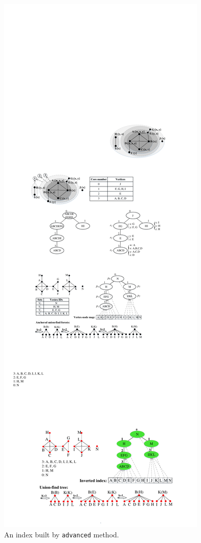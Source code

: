 \begin{figure}
	\small
	\centering
	\includegraphics[width=0.88\linewidth]{figures/advancedIndex}
	\caption{An index built by {\tt advanced} method.}
	\label{fig:advancedIndex}
\end{figure} 